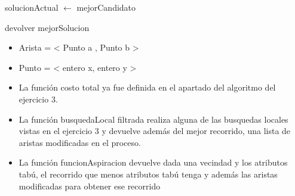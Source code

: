\begin{algorithm}[H]
{{	
	solucionActual $\leftarrow$ mejorCandidato \\
		

  	

}

devolver mejorSolucion \\

}

\end{algorithm}

\begin{itemize}
\item Arista = < Punto a , Punto b >
\item Punto = < entero x, entero y >
\item La función costo total ya fue definida en el apartado del algoritmo del ejercicio 3.
\item La función busquedaLocal filtrada realiza alguna de las busquedas locales vistas en el ejercicio 3 y devuelve además del mejor recorrido, una lista de aristas modificadas en el proceso.
\item La función funcionAspiracion devuelve dada una vecindad y los atributos tabú, el recorrido que menos atributos tabú tenga y además las aristas modificadas para obtener ese recorrido
\end{itemize}


